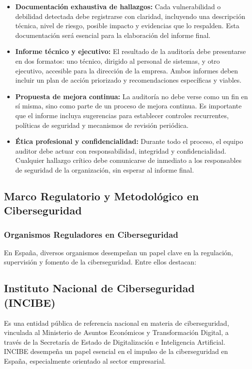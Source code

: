 \documentclass[a4paper, 10pt]{article}
\begin{document}
\begin{itemize}
    \item \textbf{Documentación exhaustiva de hallazgos:}  
    Cada vulnerabilidad o debilidad detectada debe registrarse con claridad, incluyendo una descripción técnica, nivel de riesgo, posible impacto y evidencias que lo respalden. Esta documentación será esencial para la elaboración del informe final.

    \item \textbf{Informe técnico y ejecutivo:}  
    El resultado de la auditoría debe presentarse en dos formatos: uno técnico, dirigido al personal de sistemas, y otro ejecutivo, accesible para la dirección de la empresa. Ambos informes deben incluir un plan de acción priorizado y recomendaciones específicas y viables.

    \item \textbf{Propuesta de mejora continua:}  
    La auditoría no debe verse como un fin en sí misma, sino como parte de un proceso de mejora continua. Es importante que el informe incluya sugerencias para establecer controles recurrentes, políticas de seguridad y mecanismos de revisión periódica.

    \item \textbf{Ética profesional y confidencialidad:}  
    Durante todo el proceso, el equipo auditor debe actuar con responsabilidad, integridad y confidencialidad. Cualquier hallazgo crítico debe comunicarse de inmediato a los responsables de seguridad de la organización, sin esperar al informe final.

\end{itemize}

\subsection{Marco Regulatorio y Metodológico en Ciberseguridad}

\subsubsection{Organismos Reguladores en Ciberseguridad}

En España, diversos organismos desempeñan un papel clave en la regulación, supervisión y fomento de la ciberseguridad. Entre ellos destacan:
\par\vspace{0.5cm}

\subsection*{Instituto Nacional de Ciberseguridad (INCIBE)}
 Es una entidad pública de referencia nacional en materia de ciberseguridad, vinculada al Ministerio de Asuntos Económicos 
y Transformación Digital, a través de la Secretaría de Estado de Digitalización e Inteligencia Artificial. INCIBE desempeña un papel esencial en el impulso de la 
ciberseguridad en España, especialmente orientado al sector empresarial. \cite{incibe}
\end{document}

